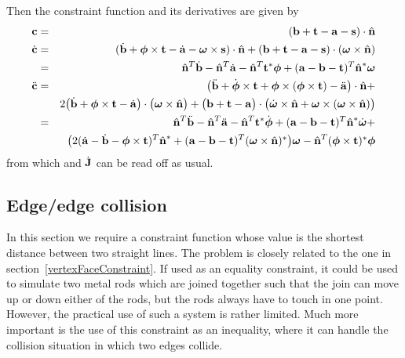 Then the constraint function and its derivatives are given by
\begin{eqnarray}
\ve{c} &=& (\ve{b} + \ve{t} - \ve{a} - \ve{s})\cdot\hat{\ve{n}} \\
\dot{\ve{c}} &=& (\dot{\ve{b}} + \ve{\phi}\times\ve{t} - \dot{\ve{a}} - \ve{\omega}\times\ve{s})
    \cdot\hat{\ve{n}} + (\ve{b} + \ve{t} - \ve{a} - \ve{s})\cdot(\ve{\omega}\times\hat{\ve{n}})
    \nonumber\\
&=& \hat{\ve{n}}^T\dot{\ve{b}} - \hat{\ve{n}}^T\dot{\ve{a}} - \hat{\ve{n}}^T\dual{\ve{t}}\ve{\phi}
    + (\ve{a} - \ve{b} - \ve{t})^T \dual{\hat{\ve{n}}} \ve{\omega} \\
\ddot{\ve{c}} &=& \big( \ddot{\ve{b}} + \dot{\ve{\phi}}\times\ve{t} +
    \ve{\phi}\times(\ve{\phi}\times\ve{t}) - \ddot{\ve{a}} \big) \cdot \hat{\ve{n}}+\nonumber\\*&&
    2\big(\dot{\ve{b}} + \ve{\phi}\times\ve{t} - \dot{\ve{a}}\big)
    \cdot \big(\ve{\omega}\times\hat{\ve{n}}\big)
    + \big(\ve{b} + \ve{t} - \ve{a}\big) \cdot \big( \dot{\ve{\omega}}\times\hat{\ve{n}} +
    \ve{\omega}\times(\ve{\omega}\times\hat{\ve{n}}) \big) \nonumber\\
&=&  \hat{\ve{n}}^T \ddot{\ve{b}}
    -\hat{\ve{n}}^T \ddot{\ve{a}}
    -\hat{\ve{n}}^T\dual{\ve{t}} \dot{\ve{\phi}}
    +(\ve{a} - \ve{b} - \ve{t})^T \dual{\hat{\ve{n}}} \dot{\ve{\omega}} + \\*&&
    \big( 2(\dot{\ve{a}} - \dot{\ve{b}} - \ve{\phi}\times\ve{t})^T \dual{\hat{\ve{n}}} 
    +(\ve{a} - \ve{b} - \ve{t})^T \dual{(\ve{\omega}\times\hat{\ve{n}})}\big) \ve{\omega}
    -\hat{\ve{n}}^T\dual{(\ve{\phi}\times\ve{t})} \ve{\phi} \nonumber
\end{eqnarray}
from which  and $\dot{\m{J}}$ can be read off as usual.


\subsection{Edge/edge collision\label{edgeEdgeConstraint}}

In this section we require a constraint function whose value is the shortest distance between
two straight lines. The problem is closely related to the one in
section~\ref{vertexFaceConstraint}. If used as an equality constraint, it could be used to
simulate two metal rods which are joined together such that the join can move up or down either
of the rods, but the rods always have to touch in one point. However, the practical use of such
a system is rather limited. Much more important is the use of this constraint as an inequality,
where it can handle the collision situation in which two edges collide.

